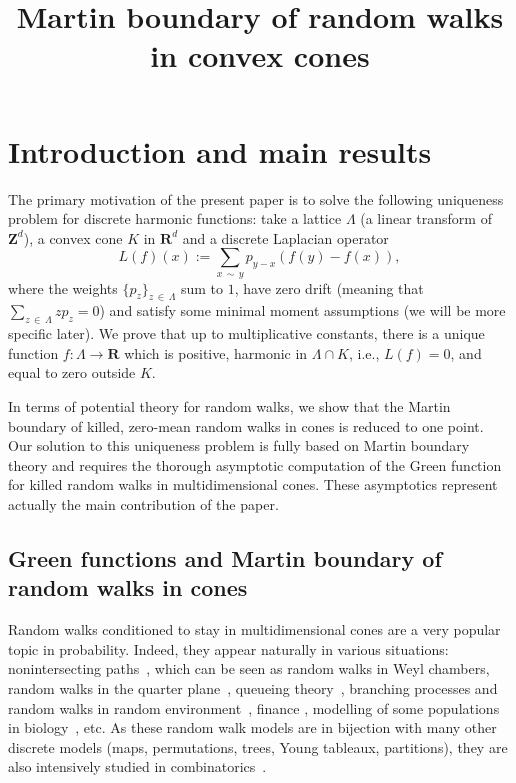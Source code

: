 \documentclass[AHL,Unicode,longabstracts,published]{cedram}
\title{Martin boundary of random walks in convex cones}
\author[\initial{J.} \lastname{Duraj}]{\firstname{Jetlir} \lastname{Duraj}}
\author[\initial{K.} \lastname{Raschel}]{\firstname{Kilian} \lastname{Raschel}}
\author[\initial{P.} \lastname{Tarrago}]{\firstname{Pierre} \lastname{Tarrago}}
\author[\initial{V.} \lastname{Wachtel}]{\firstname{Vitali} \lastname{Wachtel}}
\newcommand{\bfR}{\mathbf{R}}
\newcommand{\bfZ}{\mathbf{Z}}
\begin{document}
\maketitle


\section{Introduction and main results}\label{sec:intro}

The primary motivation of the present paper is to solve the following uniqueness problem for discrete harmonic functions: take a lattice $\Lambda$ (a linear transform of $\bfZ^d$), a convex cone $K$ in $\bfR^d$ and a discrete Laplacian operator
\[
L(f)(x):=\sum_{x\,\sim\,y} p_{y-x} \left(f(y)-f(x)\right),
\]
where the weights $\{p_{z}\}_{z\,\in\,\Lambda}$ sum to $1$, have zero drift (meaning that $\sum_{z\,\in\,\Lambda}zp_{z}=0$) and satisfy some minimal moment assumptions (we will be more specific later). We prove that up to multiplicative constants, there is a unique function $f:\Lambda \to \bfR$ which is positive, harmonic in $\Lambda\cap K$, i.e., $L(f)=0$, and equal to zero outside $K$.
\label{page:problem}

In terms of potential theory for random walks, we show that the Martin boundary of killed, zero-mean random walks in cones is reduced to one point. Our solution to this uniqueness problem is fully based on Martin boundary theory and requires the thorough asymptotic computation of the Green function for killed random walks in multidimensional cones. These asymptotics represent actually the main contribution of the paper.



\subsection*{Green functions and Martin boundary of random walks in cones}
Random walks conditioned to stay in multidimensional cones are a very popular topic in probability. Indeed, they appear naturally in various situations: nonintersecting paths~\cite{DeWa-10,EiKo-08,St-90}, which can be seen as random walks in Weyl chambers, random walks in the quarter plane~\cite{FaIaMa-17,Ra-11}, queueing theory~\cite{CoBo-83}, branching processes and random walks in random environment~\cite{AfGeKeVa-05}, finance \cite{CodL-13}, modelling of some populations in biology~\cite{BiTr-12}, etc. As these random walk models are in bijection with many other discrete models (maps, permutations, trees, Young tableaux, partitions), they are also intensively studied in combinatorics~\cite{BoBMKaMe-16,BMMi-10,DrHaRoSi-18}.
\end{document}
